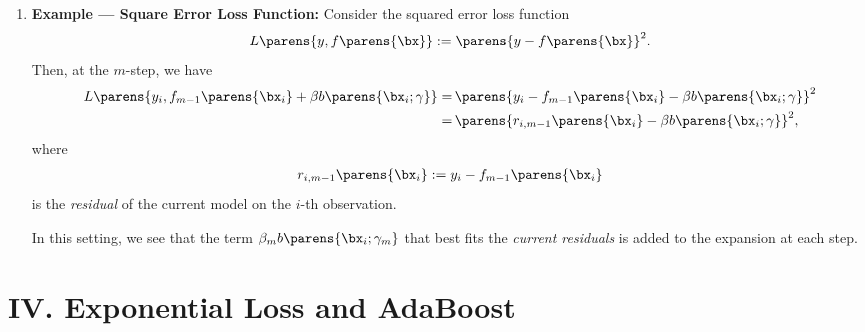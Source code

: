 \documentclass[12pt]{article}
\begin{document}
\begin{enumerate}[label=\textbf{\arabic*.}]
	\item \textbf{Example --- Square Error Loss Function:} Consider the squared error loss function 
	\begin{align*}
		L \parens{y, f \parens{\bx}} := \parens{y - f \parens{\bx}}^2. 
	\end{align*}
	Then, at the $m$-step, we have 
	\begin{align*}
		L \parens{y_i, f_{m-1} \parens{\bx_i} + \beta b \parens{\bx_i; \gamma}} = & \, \parens{y_i - f_{m-1} \parens{\bx_i} - \beta b \parens{\bx_i; \gamma}}^2 \\ 
		= & \, \parens{r_{i, m-1} \parens{\bx_i} - \beta b \parens{\bx_i; \gamma}}^2, 
	\end{align*}
	where 
	\begin{align*}
		r_{i, m-1} \parens{\bx_i} := y_i - f_{m-1} \parens{\bx_i} 
	\end{align*}
	is the \textit{residual} of the current model on the $i$-th observation. 
	
	In this setting, we see that the term $\beta_m b \parens{\bx_i; \gamma_m}$ that best fits the \textit{current residuals} is added to the expansion at each step. 

\end{enumerate}


\section*{IV. Exponential Loss and AdaBoost}
\end{document}
